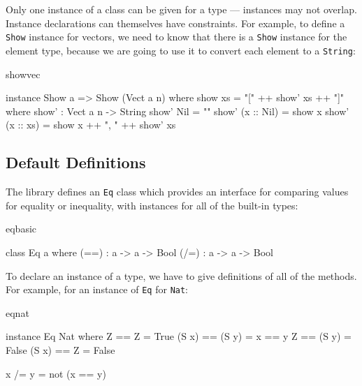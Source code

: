\noindent
Only one instance of a class can be given for a type --- instances may not overlap.
Instance declarations can themselves have constraints. For example, to define a
\texttt{Show} instance for vectors, we need to know that there is a \texttt{Show} 
instance for the element type, because we are going to use it to convert each element
to a \texttt{String}:

\begin{SaveVerbatim}{showvec}

instance Show a => Show (Vect a n) where
    show xs = "[" ++ show' xs ++ "]" where
        show' : Vect a n -> String
        show' Nil        = ""
        show' (x :: Nil) = show x
        show' (x :: xs)  = show x ++ ", " ++ show' xs

\end{SaveVerbatim}


\subsection{Default Definitions}

The library defines an \texttt{Eq} class which provides an interface for comparing
values for equality or inequality, with instances for all of the built-in types:

\begin{SaveVerbatim}{eqbasic}

class Eq a where
    (==) : a -> a -> Bool
    (/=) : a -> a -> Bool

\end{SaveVerbatim}

\noindent
To declare an instance of a type, we have to give definitions of all of the methods.
For example, for an instance of \texttt{Eq} for \texttt{Nat}:

\begin{SaveVerbatim}{eqnat}

instance Eq Nat where
    Z     == Z     = True
    (S x) == (S y) = x == y
    Z     == (S y) = False
    (S x) == Z     = False

    x /= y = not (x == y)

\end{SaveVerbatim}

